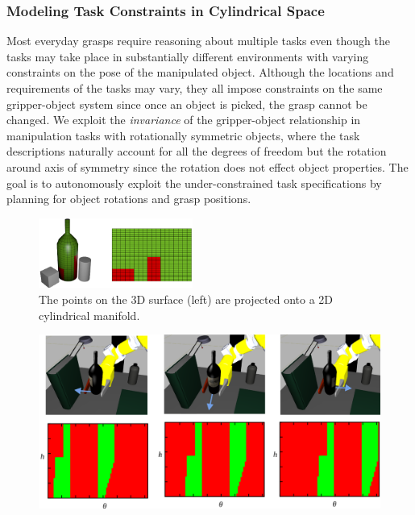 \documentclass{aamas2015}
\begin{document}
\subsubsection{Modeling Task Constraints in Cylindrical Space}

Most everyday grasps require reasoning about multiple tasks even though the tasks may take place in
substantially different environments with varying constraints on the pose of the manipulated
object. Although the locations and requirements of the tasks may vary, they all impose constraints 
on the same gripper-object system since once an object is picked, the grasp cannot be changed. 
We exploit the \textit{invariance} of the gripper-object relationship in manipulation tasks with 
rotationally symmetric objects, where the task descriptions naturally account for all the degrees 
of freedom but the rotation around axis of symmetry since the rotation does not effect object
properties. The goal is to autonomously exploit the under-constrained task specifications by
planning for object rotations and grasp positions. 

\begin{figure}[t]
  \begin{center}
    \includegraphics[width=0.45\textwidth]{./images/bottlemapping.png} \quad
  \end{center}
  \caption{The points on the 3D surface (left) are projected onto a 2D cylindrical manifold.}
  \label{fig:unfolding} 
\end{figure}

\begin{figure}[ht]
  \begin{center}
    \includegraphics[width=0.75\linewidth]{./images/rotatingWine.png} \quad
  \end{center}
  \label{fig:unfolding} 
\end{figure}
\end{document}
